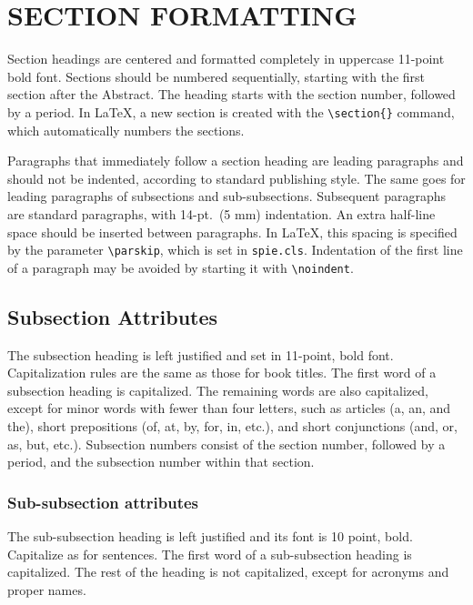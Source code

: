 \documentclass[]{spie}  %
\begin{document}
\section{SECTION FORMATTING} \label{sec:sections}

Section headings are centered and formatted completely in uppercase
11-point bold font.  Sections should be numbered sequentially,
starting with the first section after the Abstract.  The heading
starts with the section number, followed by a period.  In LaTeX, a new
section is created with the \verb|\section{}| command, which
automatically numbers the sections.

Paragraphs that immediately follow a section heading are leading
paragraphs and should not be indented, according to standard
publishing style\cite{Lamport94}.  The same goes for leading
paragraphs of subsections and sub-subsections.  Subsequent paragraphs
are standard paragraphs, with 14-pt.\ (5 mm) indentation.  An extra
half-line space should be inserted between paragraphs.  In LaTeX, this
spacing is specified by the parameter \verb|\parskip|, which is set in
{\tt spie.cls}.  Indentation of the first line of a paragraph may be
avoided by starting it with \verb|\noindent|.
 
\subsection{Subsection Attributes}

The subsection heading is left justified and set in 11-point, bold
font.  Capitalization rules are the same as those for book titles.
The first word of a subsection heading is capitalized.  The remaining
words are also capitalized, except for minor words with fewer than
four letters, such as articles (a, an, and the), short prepositions
(of, at, by, for, in, etc.), and short conjunctions (and, or, as, but,
etc.).  Subsection numbers consist of the section number, followed by
a period, and the subsection number within that section.

\subsubsection{Sub-subsection attributes}
The sub-subsection heading is left justified and its font is 10 point,
bold.  Capitalize as for sentences.  The first word of a
sub-subsection heading is capitalized.  The rest of the heading is not
capitalized, except for acronyms and proper names.
\end{document}
